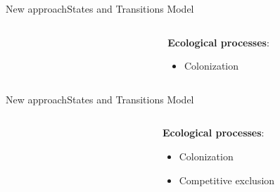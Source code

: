 \documentclass[10pt,aspectratio=149]{beamer}
\begin{document}
\begin{frame}{New approach}{States and Transitions Model}


\begin{columns}[t]
	\begin{column}[t]{.40\paperwidth}
		\begin{figure}
			\small{}
		\end{figure}
	\end{column}
	\begin{column}[t]{.50\paperwidth}
	\textbf{Ecological processes}:
	\begin{itemize}
		\item Colonization
	\end{itemize}
	\end{column}
\end{columns}

\end{frame}


\begin{frame}{New approach}{States and Transitions Model}


\begin{columns}[t]
	\begin{column}[t]{.40\paperwidth}
		\begin{figure}
			\small{}
		\end{figure}
	\end{column}
	\begin{column}[t]{.50\paperwidth}
	\textbf{Ecological processes}:
	\begin{itemize}
		\item Colonization
		\item Competitive exclusion
	\end{itemize}
	\end{column}
\end{columns}

\end{frame}

\end{document}
